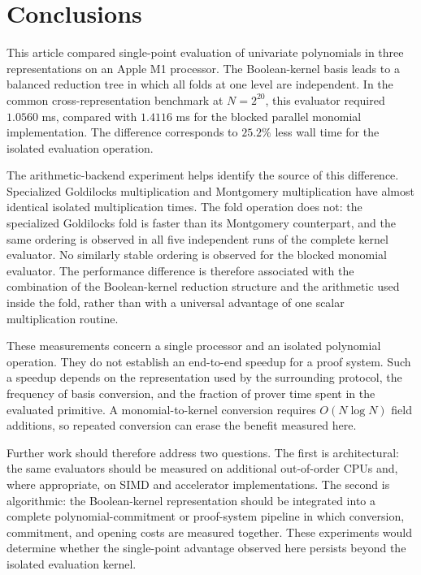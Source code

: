 \section{Conclusions}
\label{sec:conclusions}

This article compared single-point evaluation of univariate polynomials in
three representations on an Apple M1 processor.  The Boolean-kernel basis
leads to a balanced reduction tree in which all folds at one level are
independent.  In the common cross-representation benchmark at
\(N=2^{20}\), this evaluator required \(1.0560\) ms, compared with
\(1.4116\) ms for the blocked parallel monomial implementation.  The
difference corresponds to \(25.2\%\) less wall time for the isolated
evaluation operation.

The arithmetic-backend experiment helps identify the source of this
difference.  Specialized Goldilocks multiplication and Montgomery
multiplication have almost identical isolated multiplication times.  The
fold operation does not: the specialized Goldilocks fold is faster than
its Montgomery counterpart, and the same ordering is observed in all five
independent runs of the complete kernel evaluator.  No similarly stable
ordering is observed for the blocked monomial evaluator.  The performance
difference is therefore associated with the combination of the
Boolean-kernel reduction structure and the arithmetic used inside the
fold, rather than with a universal advantage of one scalar multiplication
routine.

These measurements concern a single processor and an isolated polynomial
operation.  They do not establish an end-to-end speedup for a proof system.
Such a speedup depends on the representation used by the surrounding
protocol, the frequency of basis conversion, and the fraction of prover
time spent in the evaluated primitive.  A monomial-to-kernel conversion
requires \(O(N\log N)\) field additions, so repeated conversion can erase
the benefit measured here.

Further work should therefore address two questions.  The first is
architectural: the same evaluators should be measured on additional
out-of-order CPUs and, where appropriate, on SIMD and accelerator
implementations.  The second is algorithmic: the Boolean-kernel
representation should be integrated into a complete polynomial-commitment
or proof-system pipeline in which conversion, commitment, and opening costs
are measured together.  These experiments would determine whether the
single-point advantage observed here persists beyond the isolated
evaluation kernel.
